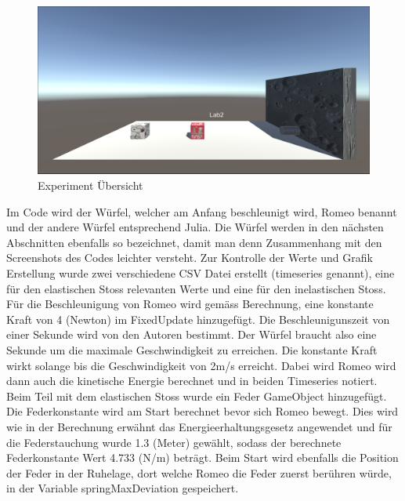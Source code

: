 \documentclass[../main.tex]{subfiles}
\begin{document}
    \begin{figure}[H]
        \begin{center}
        \centerline{\includegraphics[width=155mm]{./images/2Lab_ExperimentOverview}}
            \caption{Experiment Übersicht}
            \label{fig:2Lab_ExperimentOverview}
        \end{center}
    \end{figure}
Im Code wird der Würfel, welcher am Anfang beschleunigt wird, Romeo benannt und der andere Würfel entsprechend
Julia. Die Würfel werden in den nächsten Abschnitten ebenfalls so bezeichnet, damit man denn Zusammenhang mit den
Screenshots des Codes leichter versteht. Zur Kontrolle der Werte und Grafik Erstellung wurde zwei verschiedene
CSV Datei erstellt (timeseries genannt), eine für den elastischen Stoss relevanten Werte und eine für den inelastischen Stoss.
\newline
Für die Beschleunigung von Romeo wird gemäss Berechnung, eine konstante Kraft von 4 (Newton) im FixedUpdate hinzugefügt.
Die Beschleunigunszeit von einer Sekunde wird von den Autoren bestimmt.
Der Würfel braucht also eine Sekunde um die maximale Geschwindigkeit zu erreichen.
Die konstante Kraft wirkt solange bis die Geschwindigkeit von 2m/s erreicht.
Dabei wird Romeo wird dann auch die kinetische Energie berechnet und in beiden Timeseries notiert.
\newline
Beim Teil mit dem elastischen Stoss wurde ein Feder GameObject hinzugefügt. Die Federkonstante wird am Start berechnet
bevor sich Romeo bewegt. Dies wird wie in der Berechnung erwähnt das Energieerhaltungsgesetz angewendet und für die
Federstauchung wurde 1.3 (Meter) gewählt, sodass der berechnete Federkonstante Wert 4.733 (N/m) beträgt. Beim Start
wird ebenfalls die Position der Feder in der Ruhelage, dort welche Romeo die Feder zuerst berühren würde, in der
Variable springMaxDeviation gespeichert.
\newline
\end{document}
